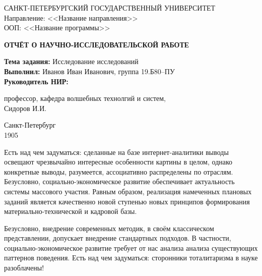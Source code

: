 \documentclass[a4paper, 12pt]{article}
\begin{document}
\begin{titlepage}
    \begin{center}
        САНКТ-ПЕТЕРБУРГСКИЙ ГОСУДАРСТВЕННЫЙ УНИВЕРСИТЕТ \\
        Направление: <<Название направления>> \\ 
        ООП: <<Название программы>> 

        \vspace{6cm}
        {\bfseries ОТЧЁТ О НАУЧНО-ИССЛЕДОВАТЕЛЬСКОЙ РАБОТЕ} 
        \vspace{\baselineskip}
        \begin{flushleft}
            {\bfseries Тема задания:} Исследование исследований \\
            \vspace{\baselineskip}
            {\bfseries Выполнил:} Иванов Иван Иванович, группа 19.Б80--ПУ \\
            \vspace{\baselineskip}
            {\bfseries Руководитель НИР:} 
                \begin{minipage}[t]{0.65\textwidth}
                    профессор, кафедра волшебных технолгий и систем,\\  Сидоров И.\:И.
                \end{minipage}
        \end{flushleft}

        \vspace{\fill}
        Санкт-Петербург \\
        1905
    \end{center}
\end{titlepage}
\addtocounter{page}{1}

\newpage
\tableofcontents

\newpage
{}
Есть над чем задуматься: сделанные на базе интернет-аналитики выводы освещают чрезвычайно интересные особенности картины в целом, однако конкретные выводы, 
разумеется, ассоциативно распределены по отраслям. Безусловно, социально-экономическое развитие обеспечивает актуальность системы массового участия. 
Равным образом, реализация намеченных плановых заданий является качественно новой ступенью новых принципов формирования материально-технической и кадровой базы.

Безусловно, внедрение современных методик, в своём классическом представлении, допускает внедрение стандартных подходов. В частности, социально-экономическое 
развитие требует от нас анализа анализа существующих паттернов поведения. Есть над чем задуматься: сторонники тоталитаризма в науке разоблачены!
\end{document}
